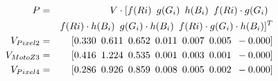 \vspace{-0.1in}
{\small
  \begin{eqnarray}
  P&=&V\cdot [ 
	    f(Ri)\mbox{\hspace{0.07in}}
	    g(G_i)\mbox{\hspace{0.07in}}
	    h(B_i)\mbox{\hspace{0.07in}}
	    f(Ri)\cdot g(G_i)\mbox{\hspace{0.07in}}\\
&&	    f(Ri)\cdot h(B_i)\mbox{\hspace{0.07in}}
	    g(G_i)\cdot h(B_i)\mbox{\hspace{0.07in}}
	    f(Ri)\cdot g(G_i)\cdot h(B_i)
  ]^T
	\nonumber \\
        V_{Pixel 2} &=& \lbrack
	     0.330\mbox{\hspace{0.07in}}
	     0.611\mbox{\hspace{0.07in}}
	     0.652\mbox{\hspace{0.07in}}
	     0.011\mbox{\hspace{0.07in}}
	     0.007\mbox{\hspace{0.07in}}
	     0.005\mbox{\hspace{0.07in}}
	    -0.000
        \rbrack   \nonumber \\
        V_{Moto Z3} &=& \lbrack
	     0.416\mbox{\hspace{0.07in}}
	     1.224\mbox{\hspace{0.07in}}
	     0.535\mbox{\hspace{0.07in}}
	     0.001\mbox{\hspace{0.07in}}
	     0.003\mbox{\hspace{0.07in}}
	     0.001\mbox{\hspace{0.07in}}
	    -0.000
        \rbrack \nonumber  \\
        V_{Pixel 4} &=& \lbrack
	     0.286\mbox{\hspace{0.07in}}
	     0.926\mbox{\hspace{0.07in}}
	     0.859\mbox{\hspace{0.07in}}
	     0.008\mbox{\hspace{0.07in}}
	     0.005\mbox{\hspace{0.07in}}
	     0.002\mbox{\hspace{0.07in}}
	    -0.000
        \rbrack \nonumber 
\end{eqnarray}
}
\noindent
{}
